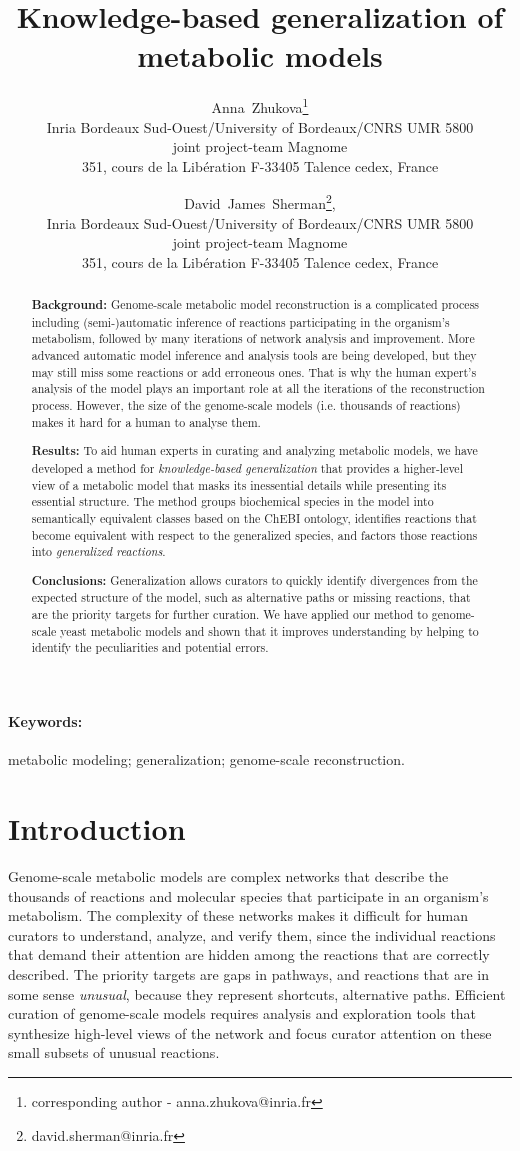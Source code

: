 \documentclass[9pt]{article}
\title{Knowledge-based generalization of metabolic models}
\author{Anna~Zhukova\thanks{corresponding author - anna.zhukova@inria.fr}\\ Inria Bordeaux Sud-Ouest/University of Bordeaux/CNRS UMR 5800\\
joint project-team Magnome\\
351, cours de la Lib\'{e}ration F-33405 Talence cedex, France
        \and David~James~Sherman\thanks{david.sherman@inria.fr}, \\ Inria Bordeaux Sud-Ouest/University of Bordeaux/CNRS UMR 5800\\
        joint project-team Magnome\\
351, cours de la Lib\'{e}ration F-33405 Talence cedex, France}
\date{}
\begin{document}
\maketitle
\newpage

\begin{abstract}
{\bf Background:} Genome-scale metabolic model reconstruction is a complicated process including (semi-)automatic inference of reactions participating in the organism's metabolism, followed by many iterations of network analysis and improvement. More advanced automatic model inference and analysis tools are being developed, but they may still miss some reactions or add erroneous ones. That is why the human expert's analysis of the model plays an important role at all the iterations of the reconstruction process. However, the size of the genome-scale models (i.e. thousands of reactions) makes it hard for a human to analyse them.

{\bf Results:} To aid human experts in curating and analyzing metabolic models, we have developed a method for \emph{knowledge-based generalization} that provides a higher-level view of a metabolic model that masks its inessential details while presenting its essential structure. The method groups biochemical species in the model into semantically equivalent classes based on the ChEBI ontology, identifies reactions that become equivalent with respect to the generalized species, and factors those reactions into \emph{generalized reactions}.

{\bf Conclusions:} Generalization allows curators to quickly identify divergences from the expected structure of the model, such as alternative paths or missing reactions, that are the priority targets for further curation.
We have applied our method to genome-scale yeast metabolic models and shown that it improves understanding by helping to identify the peculiarities and potential errors.      
\end{abstract}

\paragraph*{Keywords:} metabolic modeling; generalization; genome-scale reconstruction.

\newpage
\section*{Introduction}
Genome-scale metabolic models are complex networks that describe the thousands of reactions and molecular species that participate in an organism's metabolism.
The complexity of these networks makes it difficult for human curators to understand, analyze, and verify them, since the individual reactions that demand their attention are hidden among the reactions that are correctly described. The priority targets are gaps in pathways, and reactions that are in some sense \emph{unusual}, because they represent shortcuts, alternative paths.
Efficient curation of genome-scale models requires analysis and exploration tools that synthesize high-level views of the network and focus curator attention on these small subsets of unusual reactions.
\end{document}
